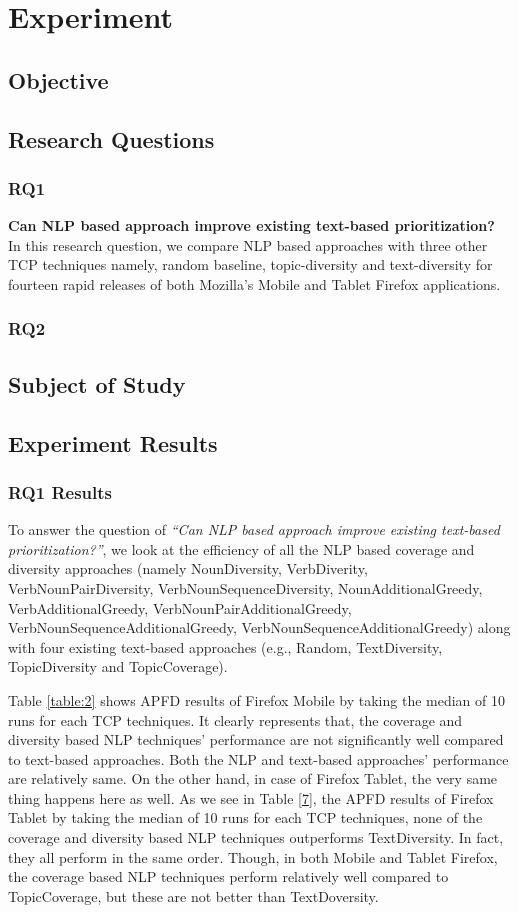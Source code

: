 \documentclass[conference]{IEEEtran}
\begin{document}
\section{Experiment}
\subsection{Objective}
\subsection{Research Questions}
\subsubsection{RQ1}
\textbf{Can NLP based approach improve existing text-based prioritization?} In this research question, we compare NLP based approaches with three other TCP techniques namely, random baseline, topic-diversity and text-diversity for fourteen rapid releases of both Mozilla’s Mobile and Tablet Firefox applications. 
\subsubsection{RQ2}
\subsection{Subject of Study}
\subsection{Experiment Results}
\subsubsection{RQ1 Results}
To answer the question of \textit{“Can NLP based approach improve existing text-based prioritization?”}, we look at the efficiency of all the NLP based coverage and diversity approaches (namely NounDiversity, VerbDiverity, VerbNounPairDiversity, VerbNounSequenceDiversity, NounAdditionalGreedy, VerbAdditionalGreedy, VerbNounPairAdditionalGreedy, VerbNounSequenceAdditionalGreedy, VerbNounSequenceAdditionalGreedy) along with four existing text-based approaches (e.g., Random, TextDiversity, TopicDiversity and TopicCoverage).

Table \ref{table:2} shows APFD results of Firefox Mobile by taking the median of 10 runs for each TCP techniques. It clearly represents that, the coverage and diversity based NLP techniques' performance are not significantly well compared to text-based approaches. Both the NLP and text-based approaches' performance are relatively same. On the other hand, in case of Firefox Tablet, the very same thing happens here as well. As we see in Table \ref{7}, the APFD results of Firefox Tablet by taking the median of 10 runs for each TCP techniques, none of the coverage and diversity based NLP techniques outperforms TextDiversity. In fact, they all perform in the same order. Though, in both Mobile and Tablet Firefox, the coverage based NLP techniques perform relatively well compared to TopicCoverage, but these are not better than TextDoversity. 
\end{document}
